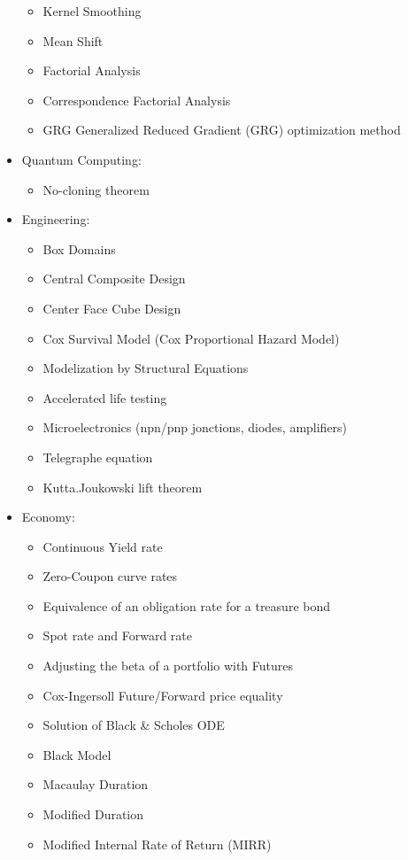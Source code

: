 \begin{itemize}
\begin{itemize}
				\item Kernel Smoothing
				\item Mean Shift
				\item Factorial Analysis
				\item Correspondence Factorial Analysis
				\item GRG Generalized Reduced Gradient (GRG) optimization method
			\end{itemize}
		\item Quantum Computing: 
			\begin{itemize}
				\item No-cloning theorem
			\end{itemize}	
		\item Engineering:
			\begin{itemize}
				\item Box Domains
				\item Central Composite Design
				\item Center Face Cube Design
				\item Cox Survival Model (Cox Proportional Hazard Model)
				\item Modelization by Structural Equations				
				\item Accelerated life testing
				\item Microelectronics (npn/pnp jonctions, diodes, amplifiers)
				\item Telegraphe equation
				\item Kutta.Joukowski lift theorem
			\end{itemize} 
		\item Economy: 
			\begin{itemize}
				\item Continuous Yield rate
				\item Zero-Coupon curve rates
				\item Equivalence of an obligation rate for a treasure bond
				\item Spot rate and Forward rate
				\item Adjusting the beta of a portfolio with Futures
				\item Cox-Ingersoll Future/Forward price equality 
				\item Solution of Black \& Scholes ODE
				\item Black Model
				\item Macaulay Duration 
				\item Modified Duration
				\item Modified Internal Rate of Return (MIRR)

\end{itemize}
\end{itemize}
